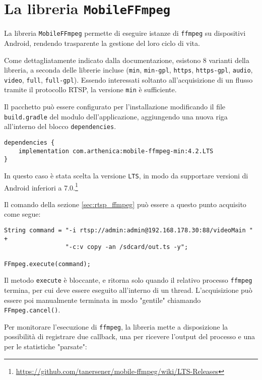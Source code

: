 \chapter{La libreria \texttt{MobileFFmpeg}}
\label{cha:allegato_ffmpeg}

La libreria \texttt{MobileFFmpeg} permette di eseguire istanze di \texttt{ffmpeg} su dispositivi Android, rendendo trasparente la gestione del loro ciclo di vita.

Come dettagliatamente indicato dalla documentazione\footnotemark{}, esistono 8 varianti della libreria, a seconda delle librerie incluse (\texttt{min}, \texttt{min-gpl}, \texttt{https}, \texttt{https-gpl}, \texttt{audio}, \texttt{video}, \texttt{full}, \texttt{full-gpl}). Essendo interessati soltanto all'acquisizione di un flusso tramite il protocollo RTSP, la versione \texttt{min} è sufficiente.


Il pacchetto può essere configurato per l'installazione modificando il file \texttt{build.gradle} del modulo dell'applicazione, aggiungendo una nuova riga all'interno del blocco \texttt{dependencies}.

\begin{verbatim}
dependencies {
    implementation com.arthenica:mobile-ffmpeg-min:4.2.LTS
}
\end{verbatim}

In questo caso è stata scelta la versione \texttt{LTS}, in modo da supportare versioni di Android inferiori a 7.0.\footnote{\url{https://github.com/tanersener/mobile-ffmpeg/wiki/LTS-Releases}}

Il comando della sezione \ref{sec:rtsp_ffmpeg} può essere a questo punto acquisito come segue:

\begin{verbatim}
String command = "-i rtsp://admin:admin@192.168.178.30:88/videoMain " +
                 "-c:v copy -an /sdcard/out.ts -y";
                 
FFmpeg.execute(command);
\end{verbatim}

Il metodo \texttt{execute} è bloccante, e ritorna solo quando il relativo processo \texttt{ffmpeg} termina, per cui deve essere eseguito all'interno di un thread. L'acquisizione può essere poi manualmente terminata in modo "gentile" chiamando \texttt{FFmpeg.cancel()}.

Per monitorare l'esecuzione di \texttt{ffmpeg}, la libreria mette a disposizione la possibilità di registrare due callback, una per ricevere l'output del processo e una per le statistiche "parsate":

